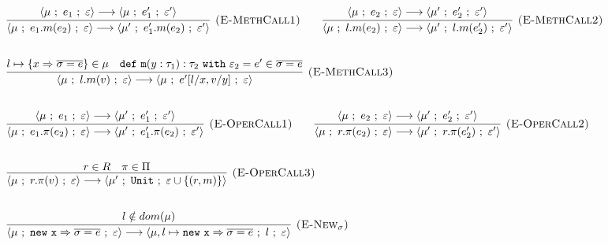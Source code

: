 \documentclass{llncs}
\newcommand{\keywadj}[1]{\mathtt{#1}}
\newcommand{\keyw}[1]{\keywadj{#1}~}
\newcommand{\config}[1] { \langle #1 \rangle }
\begin{document}
\fbox{$\config{\mu, e, \varepsilon} \longrightarrow \config{\mu, e, \varepsilon}$}

\[
\begin{array}{lll}
\begin{array}{lllr}
	\infer[\textsc{(E-MethCall1)}]
		{\config{\mu~;~e_1.m(e_2)~;~\varepsilon} \longrightarrow \config{\mu'~;~e_1'.m(e_2)~;~\varepsilon'}}
		{\config{\mu~;~e_1~;~\varepsilon} \longrightarrow \config{\mu~;~e_1'~;~\varepsilon'}}
		
		~~~~~~
		
	\infer[\textsc{(E-MethCall2)}]
		{\config{\mu~;~l.m(e_2)~;~\varepsilon} \longrightarrow \config{\mu'~;~l.m(e_2')~;~\varepsilon'}}
		{\config{\mu~;~e_2~;~\varepsilon} \longrightarrow \config{\mu'~;~e_2'~;~\varepsilon'}}\\[5ex]
		
	\infer[\textsc{(E-MethCall3)}]
		{\config{\mu~;~l.m(v)~;~\varepsilon}
			\longrightarrow
		 \config{\mu~;~e'[l/x, v/y]~;~\varepsilon}}
  		{l \mapsto \{ x \Rightarrow \overline{\sigma = e} \} \in \mu & \keywadj{def~m}(y: \tau_1) : \tau_2~\keyw{with} \varepsilon_2 = e' \in \overline {\sigma = e}} \\[5ex]

	\infer[\textsc{(E-OperCall1)}]
		{\config{\mu~;~e_1.\pi(e_2)~;~\varepsilon}
			\longrightarrow
		\config{\mu'~;~e_1'.\pi(e_2)~;~\varepsilon'}}
		{\config{\mu~;~e_1~;~\varepsilon} \longrightarrow \config{\mu'~;~e_1'~;~\varepsilon'}}
~~~~~~
			\infer[\textsc{(E-OperCall2)}]
		{\config{\mu~;~r.\pi(e_2)~;~\varepsilon}
			\longrightarrow
		\config{\mu'~;~r.\pi(e_2')~;~\varepsilon'}}
		{\config{\mu~;~e_2~;~\varepsilon} \longrightarrow \config{\mu'~;~e_2'~;~\varepsilon'}} \\[5ex]
			
			\infer[\textsc{(E-OperCall3)}]
		{\config{\mu~;~r.\pi(v)~;~\varepsilon}
			\longrightarrow
		\config{\mu'~;~\keywadj{Unit}~;~\varepsilon \cup \{(r,m)\}}}
		{r \in R & \pi \in \Pi} \\[5ex]
			
	\infer[\textsc{(E-New$_\sigma$)}]
		{\config{\mu~;~\keywadj{new~x} \Rightarrow \overline{\sigma = e}~;~\varepsilon}
			\longrightarrow
		 \config{\mu, l \mapsto \keywadj{new~x} \Rightarrow \overline{\sigma = e}~;~l~;~\varepsilon}}
		{l \notin dom(\mu)} \\[5ex]
		
\end{array}
\end{array}
\]
\end{document}
